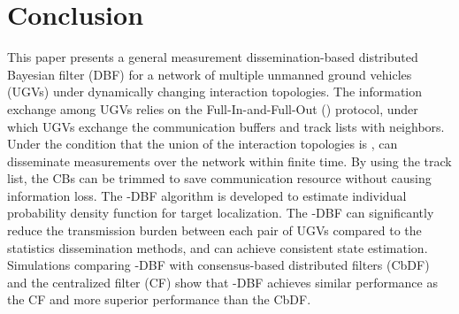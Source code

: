 \section{Conclusion}\label{sec:conclu}	
	This paper presents a general measurement dissemination-based distributed Bayesian filter (DBF) for a network of multiple unmanned ground vehicles (UGVs) under dynamically changing interaction topologies.
	The information exchange among UGVs relies on the Full-In-and-Full-Out (\proto) protocol, under which UGVs exchange the communication buffers and track lists with neighbors.
	Under the condition that the union of the interaction topologies is \fc, {\proto} can disseminate measurements over the network within finite time. 
	By using the track list, the CBs can be trimmed to save communication resource without causing information loss.
	The \proto-DBF algorithm is developed to estimate individual probability density function for target localization. 	
	The \proto-DBF can significantly reduce the transmission burden between each pair of UGVs compared to the statistics dissemination methods, and can achieve consistent state estimation.
	Simulations comparing \proto-DBF with consensus-based distributed filters (CbDF) and the centralized filter (CF) show that \proto-DBF achieves similar performance as the CF and more superior performance than the CbDF.
	

